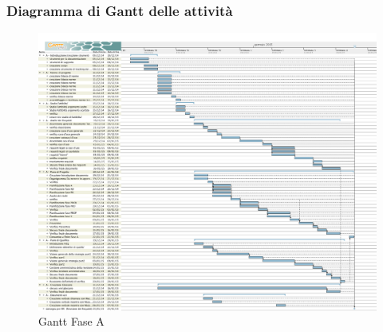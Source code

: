 	\subsubsection{Diagramma di Gantt delle attività}
	\begin{figure}[H]\centering
		\includegraphics[width=\textwidth]{PianoDiProgetto/Pics/FaseA.png}
	\caption{Gantt Fase A}
\end{figure}

